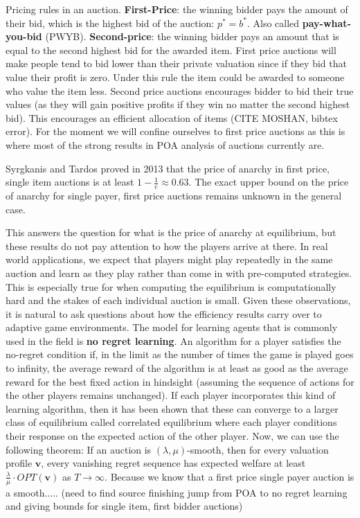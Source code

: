 \documentclass[12pt,twoside]{reedthesis}
\begin{document}
Pricing rules in an auction. \textbf{First-Price}: the winning bidder pays the amount of their bid, which is the highest bid of the auction: $p^* = b^*$. Also called \textbf{pay-what-you-bid} (PWYB). \textbf{Second-price}: the winning bidder pays an amount that is equal to the second highest bid for the awarded item. First price auctions will make people tend to bid lower than their private valuation since if they bid that value their profit is zero. Under this rule the item could be awarded to someone who value the item less. Second price auctions encourages bidder to bid their true values (as they will gain positive profits if they win no matter the second highest bid). This encourages an efficient allocation of items (CITE MOSHAN, bibtex error). For the moment we will confine ourselves to first price auctions as this is where most of the strong results in POA analysis of auctions currently are. 

Syrgkanis and Tardos proved in 2013 that the price of anarchy in first price, single item auctions is at least $1 - \frac{1}{e} \approx 0.63$. The exact upper bound on the price of anarchy for single payer, first price auctions remains unknown in the general case. 

This answers the question for what is the price of anarchy at equilibrium, but these results do not pay attention to how the players arrive at there. In real world applications, we expect that players might play repeatedly in the same auction and learn as they play rather than come in with pre-computed strategies. This is especially true for when computing the equilibrium is computationally hard and the stakes of each individual auction is small. Given these observations, it is natural to ask questions about how the efficiency results carry over to adaptive game environments. The model for learning agents that is commonly used in the field is \textbf{no regret learning}. An algorithm for a player satisfies the no-regret condition if, in the limit as the number of times the game is played goes to infinity, the average reward of the algorithm is at least as good as the average reward for the best fixed action in hindsight (assuming the sequence of actions for the other players remains unchanged). If each player  incorporates this kind of learning algorithm, then it has been shown that these can converge to a larger class of equilibrium called correlated equilibrium where each player conditions their response on the expected action of the other player. Now, we can use the following theorem: If an auction is $(\lambda, \mu)$-smooth, then for every valuation profile $\textbf{v}$, every vanishing regret sequence has expected welfare at least $\frac{\lambda}{\mu} \cdot OPT(\textbf{v})$ as $T \rightarrow \infty$. Because we know that a first price single payer auction is a smooth..... \cite{Roughgarden2017} (need to find source finishing jump from POA to no regret learning and giving bounds for single item, first bidder auctions)
\end{document}
